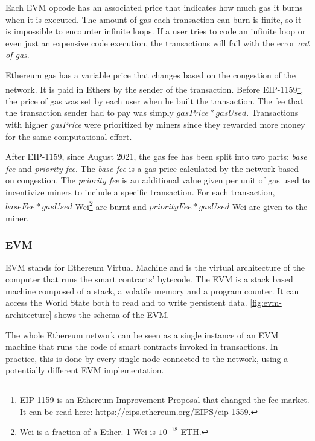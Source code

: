 Each EVM opcode has an associated price that indicates how much gas it burns when it is executed. The amount of gas each transaction can burn is finite, so it is impossible to encounter infinite loops. If a user tries to code an infinite loop or even just an expensive code execution, the transactions will fail with the error \textit{out of gas}.

Ethereum gas has a variable price that changes based on the congestion of the network. It is paid in Ethers by the sender of the transaction. Before EIP-1159\footnote{EIP-1159 is an Ethereum Improvement Proposal that changed the fee market. It can be read here: \url{https://eips.ethereum.org/EIPS/eip-1559}.}, the price of gas was set by each user when he built the transaction. The fee that the transaction sender had to pay was simply $gasPrice * gasUsed$. Transactions with higher \textit{gasPrice} were prioritized by miners since they rewarded more money for the same computational effort.

After EIP-1159, since August 2021, the gas fee has been split into two parts: \textit{base fee} and \textit{priority fee}. The \textit{base fee} is a gas price calculated by the network based on congestion. The \textit{priority fee} is an additional value given per unit of gas used to incentivize miners to include a specific transaction. For each transaction, $baseFee*gasUsed$ Wei\footnote{Wei is a fraction of a Ether. 1 Wei is $10^{-18}$ ETH.} are burnt and $priorityFee*gasUsed$ Wei are given to the miner.

\subsubsection{EVM}

EVM stands for Ethereum Virtual Machine and is the virtual architecture of the computer that runs the smart contracts' bytecode. The EVM is a stack based machine composed of a stack, a volatile memory and a program counter. It can access the World State both to read and to write persistent data. \cref{fig:evm-architecture} shows the schema of the EVM.

The whole Ethereum network can be seen as a single instance of an EVM machine that runs the code of smart contracts invoked in transactions. In practice, this is done by every single node connected to the network, using a potentially different EVM implementation.

